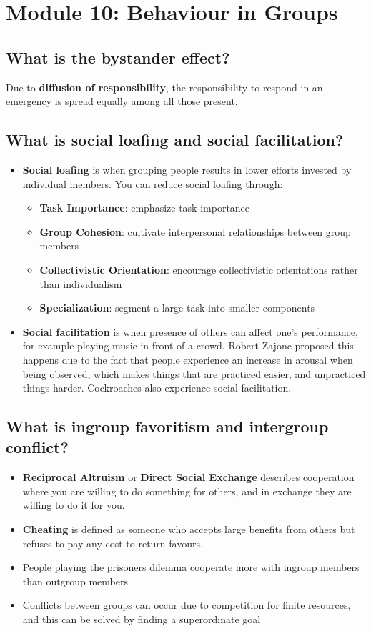 \documentclass[10pt,letter]{article}
\theoremstyle{plain}
\theoremstyle{definition}
\begin{document}
\section*{Module 10: Behaviour in Groups}
\subsection*{What is the bystander effect?}
Due to \textbf{diffusion of responsibility}, the responsibility to respond in an emergency is spread equally among all those present. 


\subsection*{What is social loafing and social facilitation?}
\begin{itemize}
    \item \textbf{Social loafing} is when grouping people results in lower efforts invested by individual members. You can reduce social loafing through:
    \begin{itemize}
        \item \textbf{Task Importance}: emphasize task importance
        \item \textbf{Group Cohesion}: cultivate interpersonal relationships between group members
        \item \textbf{Collectivistic Orientation}: encourage collectivistic orientations rather than individualism
        \item \textbf{Specialization}: segment a large task into smaller components
    \end{itemize}
    \item \textbf{Social facilitation} is when presence of others can affect one's performance, for example playing music in front of a crowd. Robert Zajonc proposed this happens due to the fact that people experience an increase in arousal when being observed, which makes things that are practiced easier, and unpracticed things harder. Cockroaches also experience social facilitation. 
\end{itemize}


\subsection*{What is ingroup favoritism and intergroup conflict?}
\begin{itemize}
    \item \textbf{Reciprocal Altruism} or \textbf{Direct Social Exchange} describes cooperation where you are willing to do something for others, and in exchange they are willing to do it for you. 
    \item \textbf{Cheating} is defined as someone who accepts large benefits from others but refuses to pay any cost to return favours.
    \item People playing the prisoners dilemma cooperate more with ingroup members than outgroup members
    \item Conflicts between groups can occur due to competition for finite resources, and this can be solved by finding a superordinate goal
\end{itemize}
\end{document}
